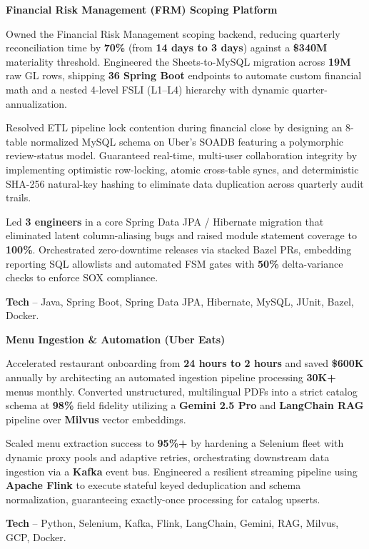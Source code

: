 \textcolor{Project}{\textbf{Financial Risk Management (FRM) Scoping Platform}}
\vspace{-0.8ex}
\begin{zitemize}
    \item Owned the Financial Risk Management scoping backend, reducing quarterly reconciliation time by \textbf{70\%} (from \textbf{14 days to 3 days}) against a \textbf{\$340M} materiality threshold. Engineered the Sheets-to-MySQL migration across \textbf{19M} raw GL rows, shipping \textbf{36 Spring Boot} endpoints to automate custom financial math and a nested 4-level FSLI (L1--L4) hierarchy with dynamic quarter-annualization.
    \item Resolved ETL pipeline lock contention during financial close by designing an 8-table normalized MySQL schema on Uber's SOADB featuring a polymorphic review-status model. Guaranteed real-time, multi-user collaboration integrity by implementing optimistic row-locking, atomic cross-table syncs, and deterministic SHA-256 natural-key hashing to eliminate data duplication across quarterly audit trails.
    \item Led \textbf{3 engineers} in a core Spring Data JPA / Hibernate migration that eliminated latent column-aliasing bugs and raised module statement coverage to \textbf{100\%}. Orchestrated zero-downtime releases via stacked Bazel PRs, embedding reporting SQL allowlists and automated FSM gates with \textbf{50\%} delta-variance checks to enforce SOX compliance.
    \item \textbf{Tech} -- Java, Spring Boot, Spring Data JPA, Hibernate, MySQL, JUnit, Bazel, Docker.
\end{zitemize}

\textcolor{Project}{\textbf{Menu Ingestion \& Automation (Uber Eats)}}
\vspace{-0.8ex}
\begin{zitemize}
    \item Accelerated restaurant onboarding from \textbf{24 hours to 2 hours} and saved \textbf{\$600K} annually by architecting an automated ingestion pipeline processing \textbf{30K+} menus monthly. Converted unstructured, multilingual PDFs into a strict catalog schema at \textbf{98\%} field fidelity utilizing a \textbf{Gemini 2.5 Pro} and \textbf{LangChain RAG} pipeline over \textbf{Milvus} vector embeddings.
    \item Scaled menu extraction success to \textbf{95\%+} by hardening a Selenium fleet with dynamic proxy pools and adaptive retries, orchestrating downstream data ingestion via a \textbf{Kafka} event bus. Engineered a resilient streaming pipeline using \textbf{Apache Flink} to execute stateful keyed deduplication and schema normalization, guaranteeing exactly-once processing for catalog upserts.
    \item \textbf{Tech} -- Python, Selenium, Kafka, Flink, LangChain, Gemini, RAG, Milvus, GCP, Docker.
\end{zitemize}

